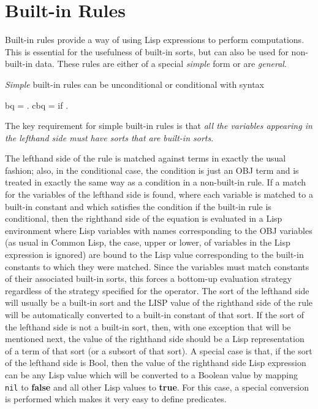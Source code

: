 \section{Built-in Rules}

Built-in rules provide a way of using Lisp expressions to perform
computations.  This is essential for the usefulness of built-in sorts,
but can also be used for non-built-in data.  These rules are either of
a special {\em simple} form or are {\em general}.

{\em Simple} built-in rules can be unconditional or conditional with
syntax

\bobj
    bq  =  . \alt
    cbq  =  if  .
\eobj

\noi The key requirement for simple built-in rules is that {\em all the
variables appearing in the lefthand side must have sorts that are
built-in sorts}.

The lefthand side of the rule is matched against terms in exactly the
usual fashion; also, in the conditional case, the condition is just an
OBJ term and is treated in exactly the same way as a condition in a
non-built-in rule.
If a match for the variables of the lefthand side is found, where each
variable is matched to a built-in constant and which satisfies the
condition if the built-in rule is conditional, then the righthand side
of the equation is evaluated in a Lisp environment where Lisp
variables with names corresponding to the OBJ variables (as usual in
Common Lisp, the case, upper or lower, of variables in the Lisp
expression is ignored) are bound to the Lisp value corresponding to
the built-in constants to which they were matched.  Since the
variables must match constants of their associated built-in sorts,
this forces a bottom-up evaluation strategy regardless of the strategy
specified for the operator.  The sort of the lefthand side will
usually be a built-in sort and the LISP value of the righthand side of
the rule will be automatically converted to a built-in constant of
that sort.  If the sort of the lefthand side is not a built-in sort,
then, with one exception that will be mentioned next, the value of the
righthand side should be a Lisp representation of a term of that sort
(or a subsort of that sort).  A special case is that, if the sort of
the lefthand side is Bool, then the value of the righthand side Lisp
expression can be any Lisp value which will be converted to a Boolean
value by mapping {\tt nil} to {\bf false} and all other Lisp values to
{\bf true}.  For this case, a special conversion is performed which
makes it very easy to define predicates.

